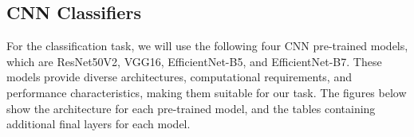 \documentclass[12pt]{diazessay}
\begin{document}
    
 
    

    \subsection{CNN Classifiers}
    \hspace{0.7cm} For the classification task, we will use the following four CNN pre-trained models, which are ResNet50V2, VGG16, EfficientNet-B5, and EfficientNet-B7. These models provide diverse architectures, computational requirements, and performance characteristics, making them suitable for our task. The figures below show the architecture for each pre-trained model, and the tables containing additional final layers for each model.


    
\end{document}
